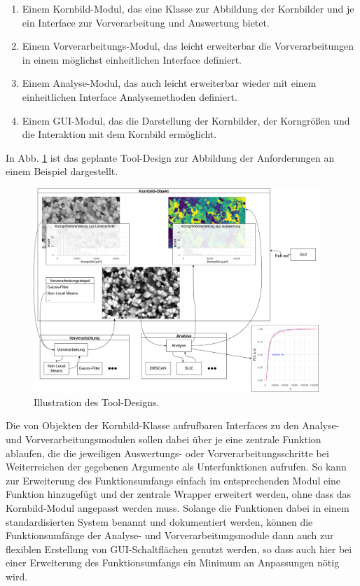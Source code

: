\documentclass[
  12pt,
  openany]{book}
\providecommand{\tightlist}{%
  \setlength{\itemsep}{0pt}\setlength{\parskip}{0pt}}
\begin{document}
\begin{enumerate}
\def\labelenumi{\arabic{enumi}.}
\tightlist
\item
  Einem Kornbild-Modul, das eine Klasse zur Abbildung der Kornbilder und je ein Interface zur Vorverarbeitung und Auswertung bietet.
\item
  Einem Vorverarbeitungs-Modul, das leicht erweiterbar die Vorverarbeitungen in einem möglichst einheitlichen Interface definiert.
\item
  Einem Analyse-Modul, das auch leicht erweiterbar wieder mit einem einheitlichen Interface Analysemethoden definiert.
\item
  Einem GUI-Modul, das die Darstellung der Kornbilder, der Korngrößen und die Interaktion mit dem Kornbild ermöglicht.
\end{enumerate}

In Abb. \ref{fig:designGraph} ist das geplante Tool-Design zur Abbildung der Anforderungen an einem Beispiel dargestellt.





\begin{figure}

{\centering \includegraphics[width=0.96\textwidth]{../imgs/design} 

}

\caption[Illustration des Tool-Designs.]{Illustration des Tool-Designs.}\label{fig:designGraph}
\end{figure}

Die von Objekten der Kornbild-Klasse aufrufbaren Interfaces zu den Analyse- und Vorverarbeitungsmodulen sollen dabei über je eine zentrale Funktion ablaufen, die die jeweiligen Auswertungs- oder Vorverarbeitungsschritte bei Weiterreichen der gegebenen Argumente als Unterfunktionen aufrufen. So kann zur Erweiterung des Funktionsumfangs einfach im entsprechenden Modul eine Funktion hinzugefügt und der zentrale Wrapper erweitert werden, ohne dass das Kornbild-Modul angepasst werden muss. Solange die Funktionen dabei in einem standardisierten System benannt und dokumentiert werden, können die Funktionsumfänge der Analyse- und Vorverarbeitungsmodule dann auch zur flexiblen Erstellung von GUI-Schaltflächen genutzt werden, so dass auch hier bei einer Erweiterung des Funktionsumfangs ein Minimum an Anpassungen nötig wird.
\end{document}

